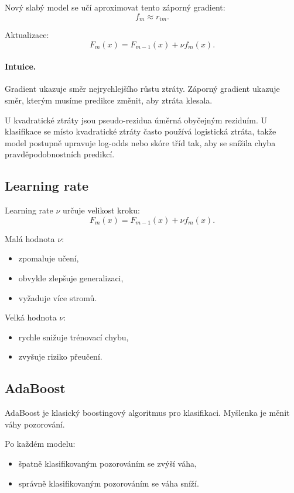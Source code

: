Nový slabý model se učí aproximovat tento záporný gradient:
\[
f_m
\approx
r_{im}.
\]

Aktualizace:
\[
F_m(x)
=
F_{m-1}(x)
+
\nu f_m(x).
\]

\paragraph{Intuice.}
Gradient ukazuje směr nejrychlejšího růstu ztráty. Záporný gradient ukazuje směr, kterým musíme predikce
změnit, aby ztráta klesala.

U kvadratické ztráty jsou pseudo-rezidua úměrná obyčejným reziduím. U klasifikace se místo kvadratické
ztráty často používá logistická ztráta, takže model postupně upravuje log-odds nebo skóre tříd tak, aby se
snížila chyba pravděpodobnostních predikcí.

\subsection{Learning rate}

Learning rate $\nu$ určuje velikost kroku:
\[
F_m(x)=F_{m-1}(x)+\nu f_m(x).
\]

Malá hodnota $\nu$:
\begin{itemize}
    \item zpomaluje učení,
    \item obvykle zlepšuje generalizaci,
    \item vyžaduje více stromů.
\end{itemize}

Velká hodnota $\nu$:
\begin{itemize}
    \item rychle snižuje trénovací chybu,
    \item zvyšuje riziko přeučení.
\end{itemize}

\subsection{AdaBoost}

AdaBoost je klasický boostingový algoritmus pro klasifikaci. Myšlenka je měnit váhy pozorování.

Po každém modelu:
\begin{itemize}
    \item špatně klasifikovaným pozorováním se zvýší váha,
    \item správně klasifikovaným pozorováním se váha sníží.
\end{itemize}

